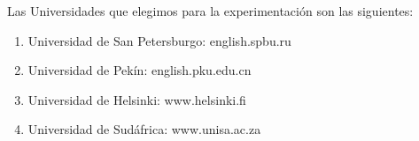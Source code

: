 Las Universidades que elegimos para la experimentación son las siguientes:

\begin{enumerate}
	\item Universidad de San Petersburgo: english.spbu.ru
	\item Universidad de Pekín: english.pku.edu.cn
	\item Universidad de Helsinki: www.helsinki.fi
	\item Universidad de Sudáfrica: www.unisa.ac.za
\end{enumerate}
